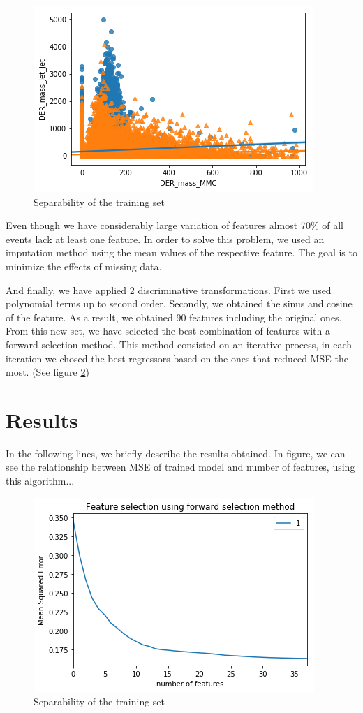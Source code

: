 \documentclass[10pt,conference,compsocconf]{IEEEtran}
\begin{document}
\begin{tiny}
		\begin{figure}[b]
			\includegraphics[scale=0.5]{separ.png}   
			\caption{Separability of the training set }
			\label{fig1}    
		\end{figure}
\end{tiny}

Even though we have considerably large variation of features almost 70\% of all events lack at least one feature. In order to solve this problem, we used an imputation method using the mean values of the respective feature. The goal is to minimize the effects of missing data. 

And finally, we have applied 2 discriminative transformations. First we used polynomial terms up to second order. Secondly, we obtained the sinus and cosine of the feature. As a result, we obtained 90 features including the original ones. From this new set, we have selected the best combination of features with a forward selection method. This method consisted on an iterative process, in each iteration we chosed the best regressors based on the ones that reduced MSE the most. (See figure \ref{fig2})


\section{Results}
\label{S1}
In the following lines, we briefly describe the results obtained. In figure{}, we can see the relationship between MSE of trained model and number of features, using this algorithm...
\begin{tiny}
	\begin{figure}[t]
		\includegraphics[scale=0.5]{Mse.png}   
		\caption{Separability of the training set }
		\label{fig2}    
	\end{figure}
\end{tiny}
\end{document}
